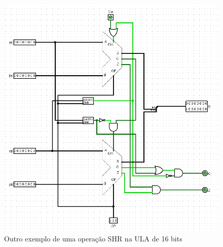 \documentclass[
	12pt,				%
	openright,			%
	twoside,			%
	a4paper,			%
	english,			%
	french,				%
	spanish,			%
	brazil,				%
	]{abntex2}
\begin{document}
\begin{apendicesenv}
\begin{itemize}
\begin{figure}[p]
	\begin{center}
	    \includegraphics[scale=0.55]{imagens/ULA16SHR_2.png}
	\end{center}
\caption{\label{ula16shr2}Outro exemplo de uma operação SHR na ULA de 16 bits}
\end{figure}

\end{itemize}

\end{apendicesenv}
\end{document}
